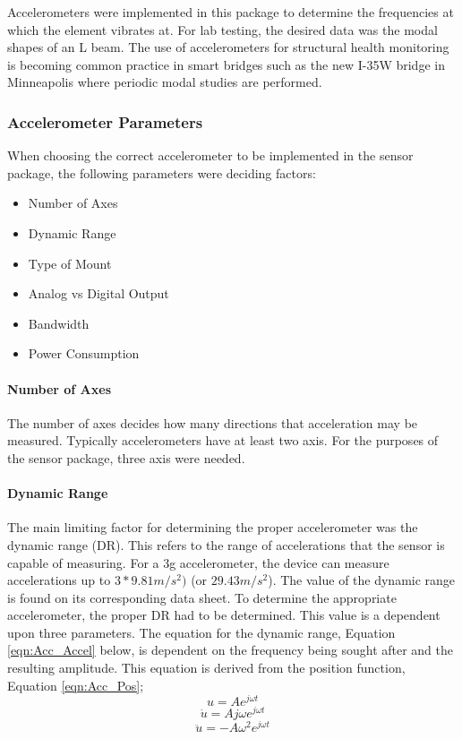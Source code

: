 \indent Accelerometers were implemented in this package to determine the frequencies at which the element vibrates at. For lab testing, the desired data was the modal shapes of an L beam. The use of accelerometers for structural health monitoring is becoming common practice in smart bridges such as the new I-35W bridge in Minneapolis where periodic modal studies are performed\cite{Kistler}.

\subsubsection{Accelerometer Parameters}
\indent When choosing the correct accelerometer to be implemented in the sensor package, the following parameters were deciding factors:
\begin{itemize}
\item Number of Axes
\item Dynamic Range
\item Type of Mount
\item Analog vs Digital Output
\item Bandwidth
\item Power Consumption
\end{itemize}

\paragraph{Number of Axes}
\indent The number of axes decides how many directions that acceleration may be measured. Typically accelerometers have at least two axis. For the purposes of the sensor package, three axis were needed.
\paragraph{Dynamic Range}
\indent The main limiting factor for determining the proper accelerometer was the dynamic range (DR).  This refers to the range of accelerations that the sensor is capable of measuring. For a 3g accelerometer, the device can measure accelerations up to $3*9.81m/s^{2})$ (or $ 29.43 m/s^{2}$).  The value of the dynamic range is found on its corresponding data sheet.  To determine the appropriate accelerometer, the proper DR had to be determined.  This value is a dependent upon three parameters.  The equation for the dynamic range, Equation \ref{eqn:Acc_Accel} below, is dependent on the frequency being sought after and the resulting amplitude.  This equation is derived from the position function, Equation \ref{eqn:Acc_Pos};  
\begin{equation}
u = Ae^{j\omega t}
\label{eqn:Acc_Pos}
\end{equation}
\begin{equation}
\dot{u} = Aj\omega e^{j\omega t}
\label{eqn:Acc_Vel}
\end{equation}
\begin{equation}
\ddot{u} = -A\omega^{2}e^{j\omega t}
\label{eqn:Acc_Accel}
\end{equation}


